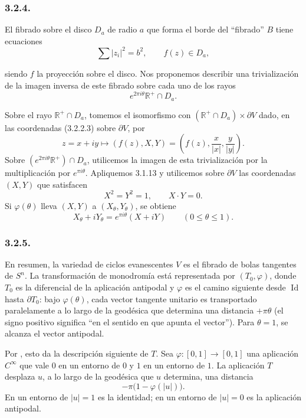 \subsubsection*{3.2.4.}
El fibrado sobre el disco $D_a$ de radio $a$ que forma el borde del
``fibrado'' $B$ tiene ecuaciones
\[
\sum |z_i|^2=b^2,
\qquad
f(z)\in D_a,
\]

\pageoriginale

siendo $f$ la proyección sobre el disco. Nos proponemos describir una
trivialización de la imagen inversa de este fibrado sobre cada uno de
los rayos
\[
e^{2\pi i\theta}\mathbb R^+\cap D_a.
\]

Sobre el rayo $\mathbb R^+\cap D_a$, tomemos el isomorfismo con
$(\mathbb R^+\cap D_a)\times\partial V$ dado, en las coordenadas
(3.2.2.3) sobre $\partial V$, por
\[
z=x+iy\longmapsto(f(z),X,Y)
  =\left(f(z),\frac{x}{|x|},\frac{y}{|y|}\right).
\]
Sobre $(e^{2\pi i\theta}\mathbb R^+)\cap D_a$, utilicemos la imagen de
esta trivialización por la multiplicación por $e^{\pi i\theta}$.
Apliquemos 3.1.13 y utilicemos sobre $\partial V$ las coordenadas $(X,Y)$
que satisfacen
\begin{equation}\tag{3.2.4.1}
X^2=Y^2=1,
\qquad
X\mathbin{\cdot}Y=0.
\end{equation}
Si $\varphi(\theta)$ lleva $(X,Y)$ a $(X_\theta,Y_\theta)$, se obtiene
\begin{equation}\tag{3.2.4.2}
X_\theta+iY_\theta
=e^{\pi i\theta}(X+iY)
\qquad(0\leq\theta\leq1).
\end{equation}

\subsubsection*{3.2.5.}
En resumen, la variedad de ciclos evanescentes $V$ es el fibrado de
bolas tangentes de $S^n$. La transformación de monodromía está
representada por $(T_0,\varphi)$, donde $T_0$ es la diferencial de la
aplicación antipodal y $\varphi$ es el camino siguiente desde
$\operatorname{Id}$ hasta $\partial T_0$: bajo $\varphi(\theta)$,
cada vector tangente unitario es transportado paralelamente a lo largo
de la geodésica que determina una distancia $+\pi\theta$ (el signo
positivo significa ``en el sentido en que apunta el vector''). Para
$\theta=1$, se alcanza el vector antipodal.

Por , esto da la descripción siguiente de $T$. Sea
$\varphi:[0,1]\to[0,1]$ una aplicación $C^\infty$ que vale $0$ en un
entorno de $0$ y $1$ en un entorno de $1$. La aplicación $T$ desplaza
$u$, a lo largo de la geodésica que $u$ determina, una distancia
\[
-\pi\bigl(1-\varphi(|u|)\bigr).
\]
En un entorno de $|u|=1$ es la identidad; en un entorno de $|u|=0$ es
la aplicación antipodal.

